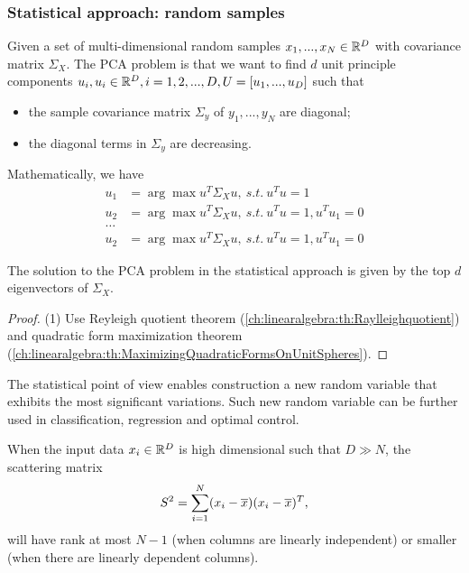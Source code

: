 \begin{refsection}
\subsubsection{Statistical approach: random samples}
\begin{definition}
	Given a set of multi-dimensional random samples $x_1,...,x_N\in \mathbb{R}^D$ with covariance matrix $\Sigma_X$.  The PCA problem is that we want to find $d$ unit principle components $u_i,u_i\in \mathbb{R}^D, i=1,2,...,D, U=[u_1,...,u_D]$ such that 
	\begin{itemize}
		\item the sample covariance matrix $\Sigma_y$ of $y_1,...,y_N$ are diagonal;
		\item the diagonal terms in $\Sigma_y$ are decreasing. 
	\end{itemize}
	
	Mathematically, we have
	\begin{align*}
	u_1 &= \arg \max u^T\Sigma_X u, ~s.t.~  u^Tu = 1  \\
	u_2 &= \arg \max u^T\Sigma_X u, ~s.t.~ u^Tu=1, u^Tu_1 = 0\\
	\dots & \\
	u_2 &= \arg \max u^T\Sigma_X u, ~s.t.~ u^Tu=1, u^Tu_1 = 0
	\end{align*}
\end{definition}

\begin{theorem}
	The solution to the PCA problem in the statistical approach is given by the top $d$ eigenvectors of $\Sigma_X$.
\end{theorem}
\begin{proof}
	(1) Use Reyleigh quotient theorem (\autoref{ch:linearalgebra:th:Raylleighquotient}) and quadratic form maximization theorem (\autoref{ch:linearalgebra:th:MaximizingQuadraticFormsOnUnitSpheres}). 
\end{proof}


\begin{remark}[implications]
	The statistical point of view enables construction a new random variable that exhibits the most significant variations. Such new random variable can be further used in classification, regression and optimal control.
\end{remark}



\begin{remark}
When the input data $x_i \in \mathbb{R}^D$ is high dimensional such that $D\gg N$, the scattering matrix 	
	$$S^2 = \sum_{i=1}^N (x_i - \overline{x})(x_i - \overline{x})^T,$$
will have rank at most $N-1$ (when columns are linearly independent) or smaller (when there are linearly dependent columns). 	
\end{remark}






\end{refsection}
